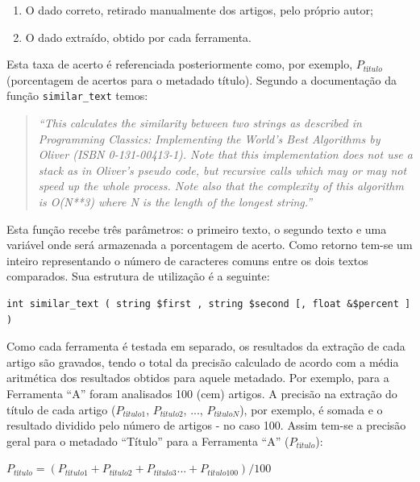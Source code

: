 \begin{enumerate}
    \item O dado correto, retirado manualmente dos artigos, pelo próprio autor;
    \item O dado extraído, obtido por cada ferramenta.
\end{enumerate}

Esta taxa de acerto é referenciada posteriormente como, por exemplo, $P_{título}$ (porcentagem de acertos para o metadado título). Segundo a documentação da função \texttt{similar\_text} temos:

\begin{quote}
    \emph{``This calculates the similarity between two strings as described in Programming Classics: Implementing the World's Best Algorithms by Oliver (ISBN 0-131-00413-1). Note that this implementation does not use a stack as in Oliver's pseudo code, but recursive calls which may or may not speed up the whole process. Note also that the complexity of this algorithm is O(N**3) where N is the length of the longest string.''}
\end{quote}

Esta função recebe três parâmetros: o primeiro texto, o segundo texto e uma variável onde será armazenada a porcentagem de acerto. Como retorno tem-se um inteiro representando o número de caracteres comuns entre os dois textos comparados. Sua estrutura de utilização é a seguinte:

\lstset{language=PHP}
\begin{lstlisting}[escapechar=\#]
int similar_text ( string $first , string $second [, float &$percent ] )
\end{lstlisting}

Como cada ferramenta é testada em separado, os resultados da extração de cada artigo são gravados, tendo o total da precisão calculado de acordo com a média aritmética dos resultados obtidos para aquele metadado. Por exemplo, para a Ferramenta ``A'' foram analisados 100 (cem) artigos. A precisão na extração do título de cada artigo ($P_{título1}$, $P_{título2}$, ..., $P_{títuloN}$), por exemplo, é somada e o resultado dividido pelo número de artigos - no caso 100. Assim tem-se a precisão geral para o metadado ``Título'' para a Ferramenta ``A'' ($P_{título}$):

\begin{center}
    \begin{math}
        P_{título} = (P_{título1} + P_{título2} + P_{título3} ... + P_{título100}) / 100
        \label{math:result-by-metadata}
    \end{math}
\end{center}

